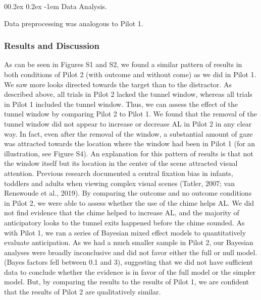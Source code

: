 \documentclass[
  english,
  man, donotrepeattitle,floatsintext]{apa6}
\makeatletter
\let\oldparagraph\paragraph
\renewcommand{\paragraph}[1]{\oldparagraph{#1}\mbox{}}
\renewcommand{\paragraph}{\@startsection{paragraph}{4}{\parindent}%
  {0\baselineskip \@plus 0.2ex \@minus 0.2ex}%
  {-1em}%
  {\normalfont\normalsize\bfseries\itshape\typesectitle}}
\makeatother
\begin{document}
\hypertarget{data-analysis.-1}{%
\paragraph{Data Analysis.}\label{data-analysis.-1}}

Data preprocessing was analogous to Pilot 1.

\hypertarget{results-and-discussion}{%
\subsubsection{Results and Discussion}\label{results-and-discussion}}

As can be seen in Figures S1 and S2, we found a similar pattern of results in both conditions of Pilot 2 (with outcome and without come) as we did in Pilot 1. We saw more looks directed towards the target than to the distractor. As described above, all trials in Pilot 2 lacked the tunnel window, whereas all trials in Pilot 1 included the tunnel window. Thus, we can assess the effect of the tunnel window by comparing Pilot 2 to Pilot 1. We found that the removal of the tunnel window did not appear to increase or decrease AL in Pilot 2 in any clear way. In fact, even after the removal of the window, a substantial amount of gaze was attracted towards the location where the window had been in Pilot 1 (for an illustration, see Figure S4). An explanation for this pattern of results is that not the window itself but its location in the center of the scene attracted visual attention. Previous research documented a central fixation bias in infants, toddlers and adults when viewing complex visual scenes (Tatler, 2007; van Renswoude et al., 2019).
By comparing the outcome and no outcome conditions in Pilot 2, we were able to assess whether the use of the chime helps AL. We did not find evidence that the chime helped to increase AL, and the majority of anticipatory looks to the tunnel exits happened before the chime sounded. As with Pilot 1, we ran a series of Bayesian mixed effect models to quantitatively evaluate anticipation. As we had a much smaller sample in Pilot 2, our Bayesian analyses were broadly inconclusive and did not favor either the full or null model. (Bayes factors fell between 0.1 and 3), suggesting that we did not have sufficient data to conclude whether the evidence is in favor of the full model or the simpler model. But, by comparing the results to the results of Pilot 1, we are confident that the results of Pilot 2 are qualitatively similar.
\end{document}

